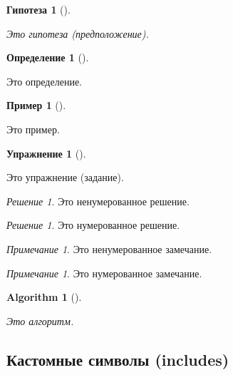 \documentclass[
  russian,
  letterpaper,
  DIV=11,
  numbers=noendperiod,
  oneside]{scrreprt}
\theoremstyle{definition}
\newtheorem{exercise}{Упражнение}[chapter]
\theoremstyle{plain}
\theoremstyle{plain}
\theoremstyle{definition}
\newtheorem{definition}{Определение}[chapter]
\theoremstyle{plain}
\theoremstyle{plain}
\newtheorem{conjecture}{Гипотеза}[chapter]
\theoremstyle{plain}
\theoremstyle{plain}
\newtheorem{algorithm}{Algorithm}[chapter]
\theoremstyle{definition}
\newtheorem{example}{Пример}[chapter]
\theoremstyle{remark}
\newtheorem*{remark}{Примечание}
\newtheorem*{solution}{Решение}
\newtheorem{refremark}{Примечание}[chapter]
\newtheorem{refsolution}{Решение}[chapter]
\begin{document}
\begin{conjecture}[]\protect\hypertarget{cnj-debug}{}\label{cnj-debug}

Это гипотеза (предположение).

\end{conjecture}

\begin{definition}[]\protect\hypertarget{def-debug}{}\label{def-debug}

Это определение.

\end{definition}

\begin{example}[]\protect\hypertarget{exm-debug}{}\label{exm-debug}

Это пример.

\end{example}

\begin{exercise}[]\protect\hypertarget{exr-debug}{}\label{exr-debug}

Это упражнение (задание).

\end{exercise}

\begin{solution}
Это ненумерованное решение.
\end{solution}

\begin{refsolution}
Это нумерованное решение.

\label{sol-debug}

\end{refsolution}

\begin{remark}
Это ненумерованное замечание.
\end{remark}

\begin{refremark}
Это нумерованное замечание.

\label{rem-debug}

\end{refremark}

\begin{algorithm}[]\protect\hypertarget{alg-debug}{}\label{alg-debug}

Это алгоритм.

\end{algorithm}

\subsection{Кастомные символы (includes)}\label{debug-maths-includes}
\end{document}
